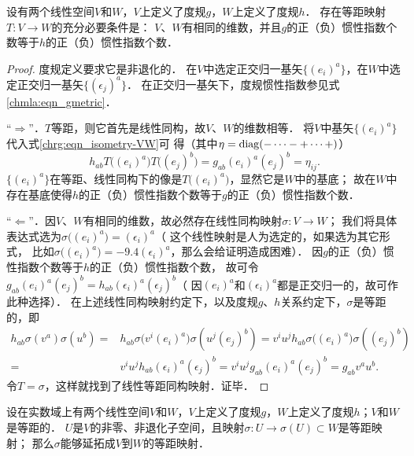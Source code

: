 \begin{proposition}\label{chrg:thm_isometry-VW}
设有两个线性空间$V$和$W$，$V$上定义了度规$g$，$W$上定义了度规$h$．
存在等距映射$T:V\to W$的充分必要条件是：
$V$、$W$有相同的维数，并且$g$的正（负）惯性指数个数等于$h$的正（负）惯性指数个数．    
\end{proposition}
\begin{proof}
        度规定义要求它是非退化的．
    在$V$中选定正交归一基矢$\{(e_i)^a\}$，在$W$中选定正交归一基矢$\{(\epsilon_j)^a\}$．
    在正交归一基矢下，度规惯性指数参见式\eqref{chmla:eqn_gmetric}．
    
    “$\Rightarrow$”．$T$等距，则它首先是线性同构，故$V$、$W$的维数相等．
    将$V$中基矢$\{(e_i)^a\}$代入式\eqref{chrg:eqn_isometry-VW}可
    得（其中$\eta={\rm diag}(-\cdots -+\cdots +)$）
    \begin{equation}
         h_{ab} T\bigl((e_i)^a\bigr) T\bigl((e_j)^b\bigr) = g_{ab} (e_i)^a(e_j)^b = \eta_{ij} .
    \end{equation}
    $\{(e_i)^a\}$在等距、线性同构下的像是$T\bigl((e_i)^a\bigr)$，显然它是$W$中的基底；
    故在$W$中存在基底使得$h$的正（负）惯性指数个数等于$g$的正（负）惯性指数个数．  
    
    “$\Leftarrow$”．因$V$、$W$有相同的维数，故必然存在线性同构映射$\sigma:V\to W$；
    我们将具体表达式选为$\sigma\bigl((e_i)^a\bigr) = (\epsilon_i)^a$（
    这个线性映射是人为选定的，如果选为其它形式，
    比如$\sigma\bigl((e_i)^a\bigr) =-9.4 (\epsilon_i)^a$，那么会给证明造成困难）．
    因$g$的正（负）惯性指数个数等于$h$的正（负）惯性指数个数，
    故可令$g_{ab}(e_i)^a(e_j)^b = h_{ab}(\epsilon_i)^a(\epsilon_j)^b$（
    因$(e_i)^a$和$(\epsilon_i)^a$都是正交归一的，故可作此种选择）．
    在上述线性同构映射约定下，以及度规$g$、$h$关系约定下，$\sigma$是等距的，即
    \begin{align*}
    h_{ab} \sigma(v^a) \sigma(u^b)
    =&h_{ab} \sigma\bigl(v^i(e_i)^a\bigr) \sigma(u^j(e_j)^b)
    =v^i u^j h_{ab} \sigma\bigl((e_i)^a\bigr) \sigma((e_j)^b) \\
    =&v^i u^j h_{ab} (\epsilon_i)^a (\epsilon_j)^b 
    =v^i u^j g_{ab} (e_i)^a (e_j)^b  = g_{ab}v^a u^b .
    \end{align*}
    令$T=\sigma$，这样就找到了线性等距同构映射．证毕．
\end{proof}



\begin{theorem}\label{chrg:thm_Witt-isometry}
    设在实数域上有两个线性空间$V$和$W$，$V$上定义了度规$g$，$W$上定义了度规$h$；$V$和$W$是等距的．
    $U$是$V$的非零、非退化子空间，且映射$\sigma:U\to \sigma(U)\subset W$是等距映射；
    那么$\sigma$能够延拓成$V$到$W$的等距映射．    
\end{theorem}

